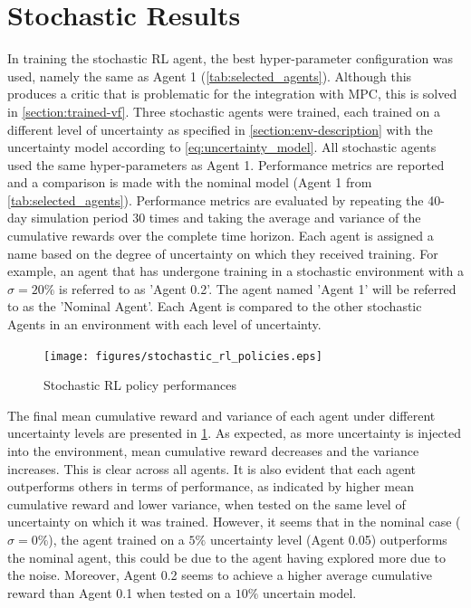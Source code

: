 \section{Stochastic Results} \label{section:rl-stochastic-results}
In training the stochastic RL agent, the best hyper-parameter configuration was used, namely the same as Agent 1 (\autoref{tab:selected_agents}). Although this produces a critic that is problematic for the integration with MPC, this is solved in \autoref{section:trained-vf}. Three stochastic agents were trained, each trained on a different level of uncertainty as specified in \autoref{section:env-description} with the uncertainty model according to \autoref{eq:uncertainty_model}. All stochastic agents used the same hyper-parameters as Agent 1. Performance metrics are reported and a comparison is made with the nominal model (Agent 1 from \autoref{tab:selected_agents}). Performance metrics are evaluated by repeating the 40-day simulation period 30 times and taking the average and variance of the cumulative rewards over the complete time horizon.
Each agent is assigned a name based on the degree of uncertainty on which they received training. For example, an agent that has undergone training in a stochastic environment with a $\sigma = 20\%$ is referred to as 'Agent 0.2'. The agent named 'Agent 1' will be referred to as the 'Nominal Agent'. Each Agent is compared to the other stochastic Agents in an environment with each level of uncertainty.

\begin{figure}[H]
    \centering
    \texttt{[image: figures/stochastic\_rl\_policies.eps]}
    \caption{Stochastic RL policy performances}
    \label{fig:stochastic-rl-policies}
\end{figure}

The final mean cumulative reward and variance of each agent under different uncertainty levels are presented in \ref{fig:stochastic-rl-policies}. As expected, as more uncertainty is injected into the environment, mean cumulative reward decreases and the variance increases. This is clear across all agents. It is also evident that each agent outperforms others in terms of performance, as indicated by higher mean cumulative reward and lower variance,  when tested on the same level of uncertainty on which it was trained. However, it seems that in the nominal case ($\sigma = 0\%$), the agent trained on a $5\%$ uncertainty level (Agent 0.05) outperforms the nominal agent, this could be due to the agent having explored more due to the noise. Moreover, Agent 0.2 seems to achieve a higher average cumulative reward than Agent 0.1 when tested on a $10\%$ uncertain model.

